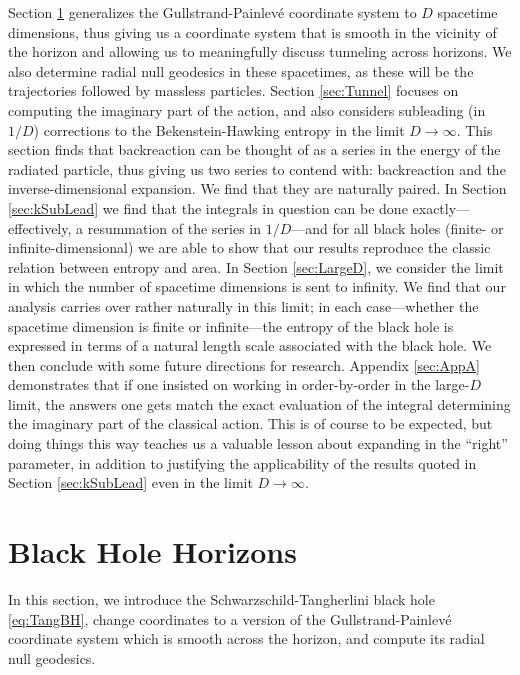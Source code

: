 \documentclass[a4paper,11pt]{article}
\begin{document}
Section \ref{sec:BH} generalizes the Gullstrand-Painlev\'e coordinate system to $D$ spacetime dimensions, thus giving us a coordinate system that is smooth in the vicinity of the horizon and allowing us to meaningfully discuss tunneling across horizons. We also determine radial null geodesics in these spacetimes, as these will be the trajectories followed by massless particles. Section \ref{sec:Tunnel} focuses on computing the imaginary part of the action, and also considers subleading (in $1/D$) corrections to the Bekenstein-Hawking entropy in the limit $D \rightarrow \infty$. This section finds that backreaction can be thought of as a series in the energy of the radiated particle, thus giving us two series to contend with: backreaction and the inverse-dimensional expansion. We find that they are naturally paired. In Section \ref{sec:kSubLead} we find that the integrals in question can be done exactly---effectively, a resummation of the series in $1/D$---and for all black holes (finite- or infinite-dimensional) we are able to show that our results reproduce the classic relation between entropy and area. In Section \ref{sec:LargeD}, we consider the limit in which the number of spacetime dimensions is sent to infinity. We find that our analysis carries over rather naturally in this limit; in each case---whether the spacetime dimension is finite or infinite---the entropy of the black hole is expressed in terms of a natural length scale associated with the black hole. We then conclude with some future directions for research. Appendix \ref{sec:AppA} demonstrates that if one insisted on working in order-by-order in the large-$D$ limit, the answers one gets match the exact evaluation of the integral determining the imaginary part of the classical action. This is of course to be expected, but doing things this way teaches us a valuable lesson about expanding in the ``right'' parameter, in addition to justifying the applicability of the results quoted in Section \ref{sec:kSubLead} even in the limit $D \rightarrow \infty$.



\section{Black Hole Horizons}
\label{sec:BH}
In this section, we introduce the Schwarzschild-Tangherlini black hole \eqref{eq:TangBH}, change coordinates to a version of the Gullstrand-Painlev\'e coordinate system which is smooth across the horizon, and compute its radial null geodesics.
\end{document}
